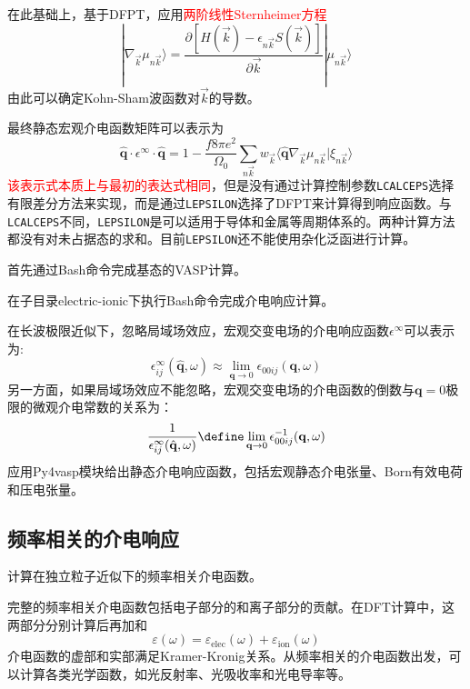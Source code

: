 在此基础上，基于\textrm{DFPT}，应用\textcolor{red}{两阶线性\textrm{Sternheimer}方程}
\begin{displaymath}
	[H(\vec k)-\epsilon_{n\vec k}S(\vec k)]|\nabla_{\vec k}\mu_{n\vec k}\rangle=\dfrac{\partial[H(\vec k)-\epsilon_{n\vec k}S(\vec k)]}{\partial\vec k}|\mu_{n\vec k}\rangle
\end{displaymath}
由此可以确定\textrm{Kohn-Sham}波函数对$\vec k$的导数。

最终静态宏观介电函数矩阵可以表示为
\begin{displaymath}
	\hat{\mathbf q}\cdot\epsilon^{\infty}\cdot\hat{\mathbf q}=1-\dfrac{f8\pi e^2}{\Omega_0}\sum_{n\vec k}w_{\vec k}\langle\hat{\mathbf q}\nabla_{\vec k}\mu_{n\vec k}|\xi_{n\vec k}\rangle
\end{displaymath}
\textcolor{red}{该表示式本质上与最初的表达式相同}，但是没有通过计算控制参数\texttt{LCALCEPS}选择有限差分方法来实现，而是通过\texttt{LEPSILON}选择了\textrm{DFPT}来计算得到响应函数。与\texttt{LCALCEPS}不同，\texttt{LEPSILON}是可以适用于导体和金属等周期体系的。两种计算方法都没有对未占据态的求和。目前\texttt{LEPSILON}还不能使用杂化泛函进行计算。%

首先通过\textrm{Bash}命令完成基态的\textrm{VASP}计算。

在子目录\textrm{electric-ionic}下执行\textrm{Bash}命令完成介电响应计算。

在长波极限近似下，忽略局域场效应，宏观交变电场的介电响应函数$\epsilon^{\infty}$可以表示为:
\begin{displaymath}
	\epsilon_{ij}^{\infty}(\hat{\mathbf{q}},\omega)\approx\lim_{\mathbf{q}\rightarrow0}\epsilon_{00ij}(\mathbf{q},\omega)
\end{displaymath}
另一方面，如果局域场效应不能忽略，宏观交变电场的介电函数的倒数与$\mathbf{q}=0$极限的微观介电常数的关系为：
\begin{displaymath}
	\dfrac1{\epsilon_{ij}^{\infty}(\hat{\mathbf{q}},\omega)}\define\lim_{\mathbf{q}\rightarrow0}\epsilon_{00ij}^{-1}(\mathbf{q},\omega)
\end{displaymath}
应用\textrm{Py4vasp}模块给出静态介电响应函数，包括宏观静态介电张量、\textrm{Born}有效电荷和压电张量。

\subsection{频率相关的介电响应}
计算在独立粒子近似下的频率相关介电函数。

完整的频率相关介电函数包括电子部分的和离子部分的贡献。在\textrm{DFT}计算中，这两部分分别计算后再加和
\begin{displaymath}
	\varepsilon(\omega)=\varepsilon_{\mathrm{elec}}(\omega)+\varepsilon_{\mathrm{ion}}(\omega)
\end{displaymath}
介电函数的虚部和实部满足\textrm{Kramer-Kronig}关系。从频率相关的介电函数出发，可以计算各类光学函数，如光反射率、光吸收率和光电导率等。

